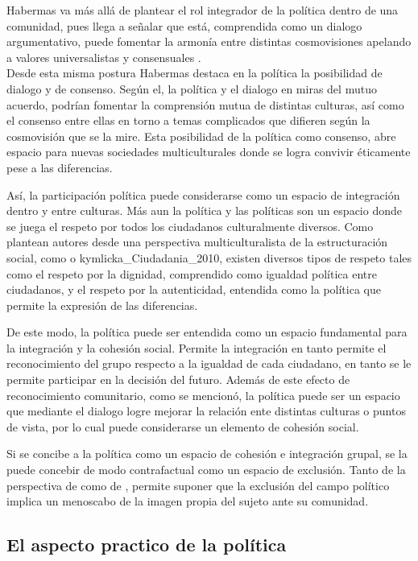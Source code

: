\documentclass[12pt,twoside]{templates/facsothesis}
\begin{document}
Habermas va más allá de plantear el rol integrador de la política dentro de una comunidad, pues llega a señalar que está, comprendida como un dialogo argumentativo, puede fomentar la armonía entre distintas cosmovisiones apelando a valores universalistas y consensuales \citep{habermas_etica_2006}.\\
Desde esta misma postura Habermas destaca en la política la posibilidad de dialogo y de consenso. Según el, la política y el dialogo en miras del mutuo acuerdo, podrían fomentar la comprensión mutua de distintas culturas, así como el consenso entre ellas en torno a temas complicados que difieren según la cosmovisión que se la mire. Esta posibilidad de la política como consenso, abre espacio para nuevas sociedades multiculturales donde se logra convivir éticamente pese a las diferencias.

Así, la participación política puede considerarse como un espacio de integración dentro y entre culturas. Más aun la política y las políticas son un espacio donde se juega el respeto por todos los ciudadanos culturalmente diversos. Como plantean autores desde una perspectiva multiculturalista de la estructuración social, como \citet{taylor_Multiculturalism_1992} o kymlicka\_Ciudadania\_2010, existen diversos tipos de respeto tales como el respeto por la dignidad, comprendido como igualdad política entre ciudadanos, y el respeto por la autenticidad, entendida como la política que permite la expresión de las diferencias.

De este modo, la política puede ser entendida como un espacio fundamental para la integración y la cohesión social. Permite la integración en tanto permite el reconocimiento del grupo respecto a la igualdad de cada ciudadano, en tanto se le permite participar en la decisión del futuro. Además de este efecto de reconocimiento comunitario, como se mencionó, la política puede ser un espacio que mediante el dialogo logre mejorar la relación ente distintas culturas o puntos de vista, por lo cual puede considerarse un elemento de cohesión social.

Si se concibe a la política como un espacio de cohesión e integración grupal, se la puede concebir de modo contrafactual como un espacio de exclusión. Tanto de la perspectiva de \citet{honneth_Lucha_1997} como de \citet{fraser_Fortunes_2020}, permite suponer que la exclusión del campo político implica un menoscabo de la imagen propia del sujeto ante su comunidad.

\hypertarget{el-aspecto-practico-de-la-poluxedtica}{%
\subsection{El aspecto practico de la política}\label{el-aspecto-practico-de-la-poluxedtica}}
\end{document}
